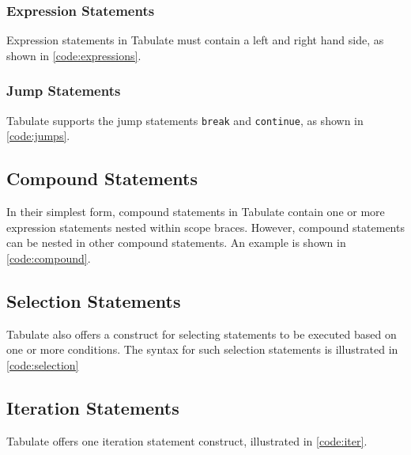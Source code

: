 \documentclass[conference,compsoc]{IEEEtran}
\begin{document}


\subsubsection{Expression Statements}
Expression statements in Tabulate must contain a left and right hand side, as
shown in \autoref{code:expressions}.



\subsubsection{Jump Statements}
Tabulate supports the jump statements \texttt{break} and \texttt{continue}, as
shown in \autoref{code:jumps}.



\subsection{Compound Statements}
In their simplest form, compound statements in Tabulate contain one or more
expression statements nested within scope braces. However, compound statements
can be nested in other compound statements. An example is shown in
\autoref{code:compound}.



\subsection{Selection Statements}
Tabulate also offers a construct for selecting statements to be executed based
on one or more conditions. The syntax for such selection statements is
illustrated in \autoref{code:selection}



\subsection{Iteration Statements}
Tabulate offers one iteration statement construct, illustrated in
\autoref{code:iter}.
\end{document}
